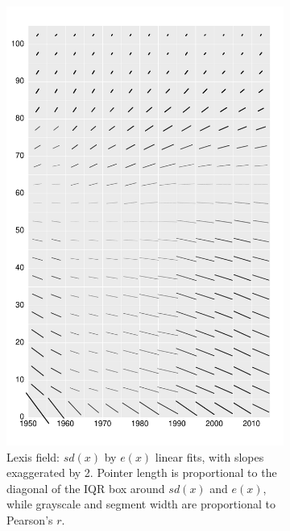 \documentclass{article}
\begin{document}
\begin{figure}
\begin{subfigure}{.48\textwidth}
  \includegraphics[scale=.38]{Figures/FigApp3.pdf}
  \caption{Lexis field: $sd(x)$ by $e(x)$ linear fits, with slopes exaggerated by 2. Pointer length is proportional to the diagonal of the IQR box around $sd(x)$ and $e(x)$, while grayscale and segment width are proportional to Pearson's $r$.}
  \label{fig:sfig3}
\end{subfigure}%
\begin{subfigure}{.48\textwidth}
\captionsetup{width=.8\linewidth}
  \centering

\end{subfigure}
\end{figure}
\end{document}
